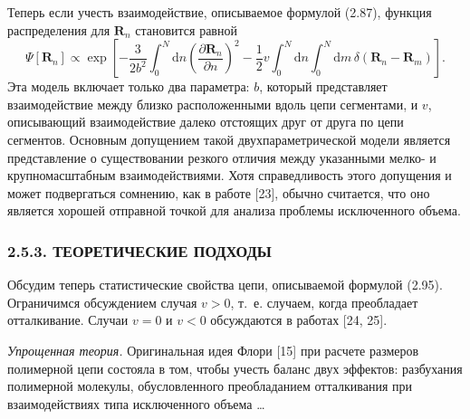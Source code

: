 \documentclass[12pt,a4paper]{article}
\begin{document}
Теперь если учесть взаимодействие, описываемое формулой (2.87), функция распределения для $\boldsymbol{R}_n$ становится равной
\begin{equation}
\Psi[\boldsymbol{R}_n] \propto \exp\left[-\frac{3}{2b^2}\int_0^N\!\mathrm{d}n\left(\frac{\partial\boldsymbol{R}_n}{\partial n}\right)^2 - \frac{1}{2}v\int_0^N\!\mathrm{d}n\int_0^N\!\mathrm{d}m\,\delta(\boldsymbol{R}_n - \boldsymbol{R}_m)\right]. \tag{2.95}
\end{equation}
Эта модель включает только два параметра: $b$, который представляет взаимодействие между близко расположенными вдоль цепи сегментами, и $v$, описывающий взаимодействие далеко отстоящих друг от друга по цепи сегментов. Основным допущением такой двухпараметрической модели является представление о существовании резкого отличия между указанными мелко- и крупномасштабным взаимодействиями. Хотя справедливость этого допущения и может подвергаться сомнению, как в работе [23], обычно считается, что оно является хорошей отправной точкой для анализа проблемы исключенного объема.

\subsubsection*{2.5.3. ТЕОРЕТИЧЕСКИЕ ПОДХОДЫ}

Обсудим теперь статистические свойства цепи, описываемой формулой (2.95). Ограничимся обсуждением случая $v > 0$, т.~е. случаем, когда преобладает отталкивание. Случаи $v = 0$ и $v < 0$ обсуждаются в работах [24, 25].

\textit{Упрощенная теория.} Оригинальная идея Флори [15] при расчете размеров полимерной цепи состояла в том, чтобы учесть баланс двух эффектов: разбухания полимерной молекулы, обусловленного преобладанием отталкивания при взаимодействиях типа исключенного объема \dots
\end{document}
